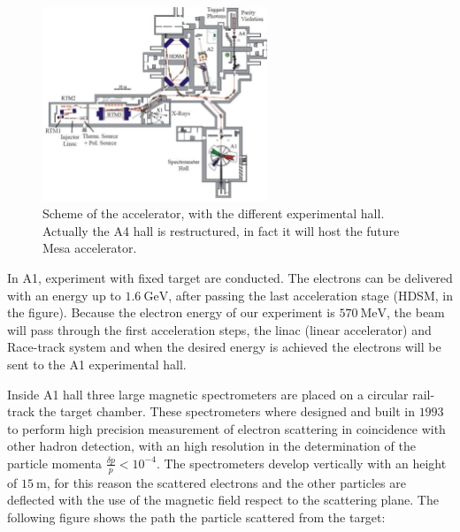 \begin{figure}[hbtp]
\centering
\includegraphics[width = 0.6\textwidth]{ExperimentalSetup/Accelerator.pdf}
\caption{Scheme of the accelerator, with the different experimental hall. Actually the A4 hall is restructured, in fact it will host the future Mesa accelerator.}
\label{fig:Accelerator}
\end{figure}

In A1, experiment with fixed target are conducted. The electrons can be delivered with an energy up to $\SI{1.6}{\giga \electronvolt}$, after passing the last acceleration stage (HDSM, in the figure). Because the electron energy of our experiment is $\SI{570}{\mega \electronvolt}$, the beam will pass through the first acceleration steps, the linac (linear accelerator) and Race-track system and when the desired energy is achieved the electrons will be sent to the A1 experimental hall. \medskip

Inside A1 hall three large magnetic spectrometers are placed on a circular rail-track the target chamber. These spectrometers where designed and built in $1993$ to perform high precision measurement of electron scattering in coincidence with other hadron detection, with an high resolution in the determination of the particle momenta $\frac{\delta p}{p} < 10^{-4}$. The spectrometers develop vertically with an height of $\SI{15}{\meter}$, for this reason the scattered electrons and the other particles are deflected with the use of the magnetic field respect to the scattering plane. The following figure shows the path the particle scattered from the target:

